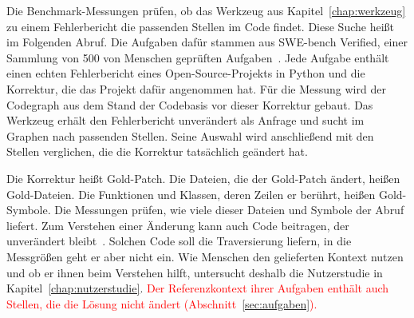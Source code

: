 
Die Benchmark-Messungen prüfen, ob das Werkzeug aus Kapitel~\ref{chap:werkzeug} zu einem Fehlerbericht die passenden Stellen im Code findet. Diese Suche heißt im Folgenden Abruf. Die Aufgaben dafür stammen aus SWE-bench Verified, einer Sammlung von 500 von Menschen geprüften Aufgaben~\parencite{openai2024sweverified}. Jede Aufgabe enthält einen echten Fehlerbericht eines Open-Source-Projekts in Python und die Korrektur, die das Projekt dafür angenommen hat. Für die Messung wird der Codegraph aus dem Stand der Codebasis vor dieser Korrektur gebaut. Das Werkzeug erhält den Fehlerbericht unverändert als Anfrage und sucht im Graphen nach passenden Stellen. Seine Auswahl wird anschließend mit den Stellen verglichen, die die Korrektur tatsächlich geändert hat.

Die Korrektur heißt Gold-Patch. Die Dateien, die der Gold-Patch ändert, heißen Gold-Dateien. Die Funktionen und Klassen, deren Zeilen er berührt, heißen Gold-Symbole. Die Messungen prüfen, wie viele dieser Dateien und Symbole der Abruf liefert. Zum Verstehen einer Änderung kann auch Code beitragen, der unverändert bleibt~\parencite{jimenez2024swebench}. Solchen Code soll die Traversierung liefern, in die Messgrößen geht er aber nicht ein. Wie Menschen den gelieferten Kontext nutzen und ob er ihnen beim Verstehen hilft, untersucht deshalb die Nutzerstudie in Kapitel~\ref{chap:nutzerstudie}. \textcolor{red}{Der Referenzkontext ihrer Aufgaben enthält auch Stellen, die die Lösung nicht ändert (Abschnitt~\ref{sec:aufgaben}).}

